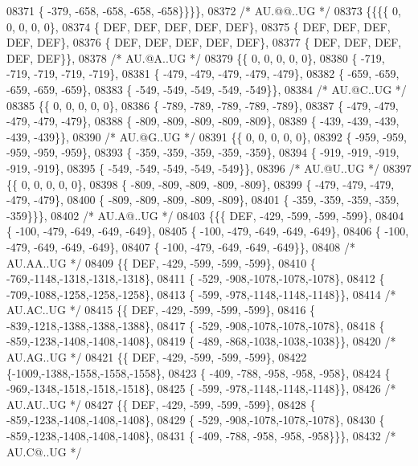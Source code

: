 \begin{DoxyCode}
08371 \{ -379, -658, -658, -658, -658\}\}\}\},
08372 \textcolor{comment}{/* AU.@@..UG */}
08373 \{\{\{\{    0,    0,    0,    0,    0\},
08374 \{  DEF,  DEF,  DEF,  DEF,  DEF\},
08375 \{  DEF,  DEF,  DEF,  DEF,  DEF\},
08376 \{  DEF,  DEF,  DEF,  DEF,  DEF\},
08377 \{  DEF,  DEF,  DEF,  DEF,  DEF\}\},
08378 \textcolor{comment}{/* AU.@A..UG */}
08379 \{\{    0,    0,    0,    0,    0\},
08380 \{ -719, -719, -719, -719, -719\},
08381 \{ -479, -479, -479, -479, -479\},
08382 \{ -659, -659, -659, -659, -659\},
08383 \{ -549, -549, -549, -549, -549\}\},
08384 \textcolor{comment}{/* AU.@C..UG */}
08385 \{\{    0,    0,    0,    0,    0\},
08386 \{ -789, -789, -789, -789, -789\},
08387 \{ -479, -479, -479, -479, -479\},
08388 \{ -809, -809, -809, -809, -809\},
08389 \{ -439, -439, -439, -439, -439\}\},
08390 \textcolor{comment}{/* AU.@G..UG */}
08391 \{\{    0,    0,    0,    0,    0\},
08392 \{ -959, -959, -959, -959, -959\},
08393 \{ -359, -359, -359, -359, -359\},
08394 \{ -919, -919, -919, -919, -919\},
08395 \{ -549, -549, -549, -549, -549\}\},
08396 \textcolor{comment}{/* AU.@U..UG */}
08397 \{\{    0,    0,    0,    0,    0\},
08398 \{ -809, -809, -809, -809, -809\},
08399 \{ -479, -479, -479, -479, -479\},
08400 \{ -809, -809, -809, -809, -809\},
08401 \{ -359, -359, -359, -359, -359\}\}\},
08402 \textcolor{comment}{/* AU.A@..UG */}
08403 \{\{\{  DEF, -429, -599, -599, -599\},
08404 \{ -100, -479, -649, -649, -649\},
08405 \{ -100, -479, -649, -649, -649\},
08406 \{ -100, -479, -649, -649, -649\},
08407 \{ -100, -479, -649, -649, -649\}\},
08408 \textcolor{comment}{/* AU.AA..UG */}
08409 \{\{  DEF, -429, -599, -599, -599\},
08410 \{ -769,-1148,-1318,-1318,-1318\},
08411 \{ -529, -908,-1078,-1078,-1078\},
08412 \{ -709,-1088,-1258,-1258,-1258\},
08413 \{ -599, -978,-1148,-1148,-1148\}\},
08414 \textcolor{comment}{/* AU.AC..UG */}
08415 \{\{  DEF, -429, -599, -599, -599\},
08416 \{ -839,-1218,-1388,-1388,-1388\},
08417 \{ -529, -908,-1078,-1078,-1078\},
08418 \{ -859,-1238,-1408,-1408,-1408\},
08419 \{ -489, -868,-1038,-1038,-1038\}\},
08420 \textcolor{comment}{/* AU.AG..UG */}
08421 \{\{  DEF, -429, -599, -599, -599\},
08422 \{-1009,-1388,-1558,-1558,-1558\},
08423 \{ -409, -788, -958, -958, -958\},
08424 \{ -969,-1348,-1518,-1518,-1518\},
08425 \{ -599, -978,-1148,-1148,-1148\}\},
08426 \textcolor{comment}{/* AU.AU..UG */}
08427 \{\{  DEF, -429, -599, -599, -599\},
08428 \{ -859,-1238,-1408,-1408,-1408\},
08429 \{ -529, -908,-1078,-1078,-1078\},
08430 \{ -859,-1238,-1408,-1408,-1408\},
08431 \{ -409, -788, -958, -958, -958\}\}\},
08432 \textcolor{comment}{/* AU.C@..UG */}

\end{DoxyCode}
